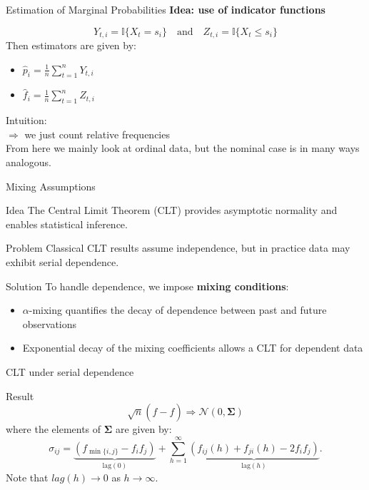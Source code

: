 \documentclass{beamer}
\begin{document}
\begin{frame}{Estimation of Marginal Probabilities}
\textbf{Idea: use of indicator functions}

\vspace{0.3cm}

\[
Y_{t,i} = \mathbb{I}\{X_t = s_i\} \quad \text{and} \quad Z_{t,i} = \mathbb{I}\{X_t \leq s_i\}
\]
Then estimators are given by:
\begin{itemize}
    \item $\hat{p}_i = \frac{1}{n} \sum_{t=1}^n Y_{t,i}$
    \item $\hat{f}_i = \frac{1}{n} \sum_{t=1}^n Z_{t,i}$
\end{itemize}

Intuition:\\
$\Rightarrow$ we just count relative frequencies\\
From here we mainly look at ordinal data, but the nominal case is in many ways analogous.
\end{frame}
\begin{frame}{Mixing Assumptions}

\begin{block}{Idea}
The Central Limit Theorem (CLT) provides asymptotic normality and enables statistical inference.
\end{block}

\begin{alertblock}{Problem}
Classical CLT results assume independence, but in practice data may exhibit serial dependence.
\end{alertblock}

\begin{block}{Solution}
To handle dependence, we impose \textbf{mixing conditions}:
\begin{itemize}
    \item $\alpha$-mixing quantifies the decay of dependence between past and future observations
    \item Exponential decay of the mixing coefficients allows a CLT for dependent data
\end{itemize}
\end{block}
\end{frame}
\begin{frame}{CLT under serial dependence}
    \begin{block}{Result}
    \[\sqrt{n}(\hat{f} - f) \Rightarrow \mathcal{N}(0, \boldsymbol{\Sigma})\]
    where the elements of $\boldsymbol{\Sigma}$ are given by:
    \[\sigma_{ij} = \underbrace{\left(f_{\min\{i,j\}}- f_i f_j\right)}_{\text{lag}(0)} + \sum_{h=1}^{\infty} \underbrace{\left(f_{ij}(h) + f_{ji}(h) - 2f_if_j\right)}_{\text{lag}(h)}.\]
    Note that $lag(h) \rightarrow 0$ as $h \rightarrow \infty$.
    \end{block}
\end{frame}
\end{document}

